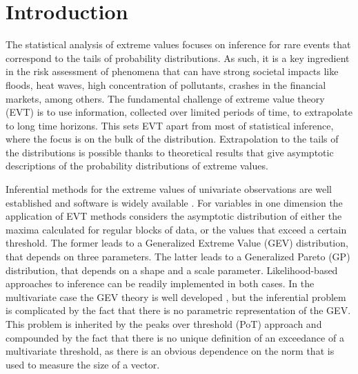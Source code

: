 
\section{Introduction}

The statistical analysis of extreme values focuses on inference for
    rare events that correspond to the tails of probability distributions.
    As such, it is a key ingredient in the risk assessment of
    phenomena that can have strong societal impacts like floods, heat waves,
    high concentration of pollutants, crashes in the financial markets,
    among others. The fundamental challenge of extreme value theory (EVT) is
    to use information, collected over limited periods of time, to
    extrapolate to long time horizons. This sets EVT apart from most of
    statistical inference, where the focus is on the bulk of the
    distribution. Extrapolation to the tails of the distributions is
    possible thanks to theoretical results that give asymptotic descriptions
    of the probability distributions of extreme values. 

Inferential methods for the extreme values of univariate observations
    are well established and software is widely available 
    \cite[see, for example,][]{coles2001}. For variables in one dimension the 
    application of EVT methods considers the asymptotic distribution of either the 
    maxima calculated for regular blocks of data, or the values that exceed a 
    certain threshold. The former leads to a Generalized Extreme Value (GEV) 
    distribution, that depends on three parameters. The latter leads to a Generalized 
    Pareto (GP) distribution, that depends on a shape and a scale parameter. 
    Likelihood-based approaches to inference can be readily implemented in both cases.
    In the multivariate case the GEV theory is well developed 
    \citep[see, for example][]{dehaan2006}, but the inferential problem is  
    complicated by the fact that there is no parametric representation of the GEV. 
    This problem is inherited by the peaks over threshold (PoT) approach and 
    compounded by the  fact that there is no unique definition of an exceedance of 
    a multivariate  threshold, as there is an obvious dependence on the norm that 
    is used to measure  the size of a vector. 

